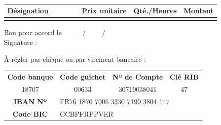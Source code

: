    \vspace{1ex}
    \\
    \textnormal\FactureDescr                                                %
%
    \begin{center}                                                          %
        \begin{tabular}{lrcr}
            \textbf{Désignation ~~~~~~}	& \textbf{Prix unitaire} & \textbf{Qté./Heures}	& \textbf{Montant}	\\
            \hline
            \AfficheResultat{}
        \end{tabular}
    \end{center}
%
    {
    \noindent
        \begin{changeLmargin}{10cm}                                         %
            \vspace{1ex}
            Bon pour accord le\ \ \ \ \ \ / \ \ \ \ / \ \ \ \ \\
            Signature :\\
        \end{changeLmargin}
        }
    {                            %
        {\vfill
            \center {}
        \vfill}
        {\vfill
        \center À régler par chèque ou par virement bancaire :

            \begin{center}
                \begin{tabular}{|c c c c|}
                    \hline 	\textbf{Code banque}	& \textbf{Code guichet}	& \textbf{Nº de Compte}		& \textbf{Clé RIB}	\\
                            18707					& 00633		 			& 30719038041				& 47				\\
                    \hline 	\textbf{IBAN Nº}		& \multicolumn{3}{|l|}{ FR76 1870 7006 3330 7190 3804 147 } 		\\
                    \hline 	\textbf{Code BIC}		& \multicolumn{3}{|l|}{ CCBPFRPPVER } 		\\
                    \hline
                \end{tabular}
            \end{center}
            \vfill
        }}
%

